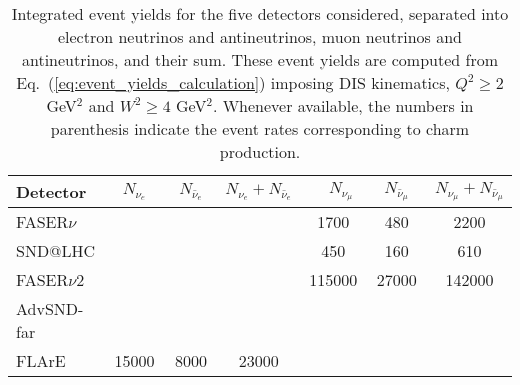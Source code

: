 \begin{table}[t]
  \centering
  \small
  \renewcommand{\arraystretch}{1.70}
\begin{tabularx}{\textwidth}{X|c|c|c|c|c|c}
\toprule
Detector & $\quad$ $N_{\nu_e}$ $\quad$ &$\quad$ $N_{\bar{\nu}_e}$$\quad$   &   $N_{\nu_e} + N_{\bar{\nu}_e}$ &
$\quad$$N_{\nu_\mu}$ $\quad$ & $\quad$ $N_{\bar{\nu}_\mu}$ $\quad$  &   $N_{\nu_\mu} + N_{\bar{\nu}_\mu}$ \\
\midrule
\midrule
FASER$\nu$  &    &    &   &  1700  &  480  &  2200  \\
SND@LHC  &    &    &   &  450 & 160   &  610  \\
\midrule
\midrule
FASER$\nu$2  &    &    &   & 115000  & 27000    & 142000   \\
AdvSND-far  &    &    &   &   &    &    \\
FLArE & 15000 & 8000   &  23000 &   &    &    \\
  \bottomrule
\end{tabularx}
\vspace{0.2cm}
\caption{\small Integrated event yields for the five detectors considered,
  separated into electron neutrinos and antineutrinos,
  muon neutrinos and antineutrinos, and their sum.
  These event yields are computed from Eq.~(\ref{eq:event_yields_calculation})
  imposing DIS kinematics, $Q^2 \ge 2$ GeV$^2$ and $W^2 \ge 4$ GeV$^2$.
  Whenever available, the
  numbers in parenthesis indicate the event rates corresponding to charm
  production.
  \label{tab:integrated_rates}
}
\end{table}
